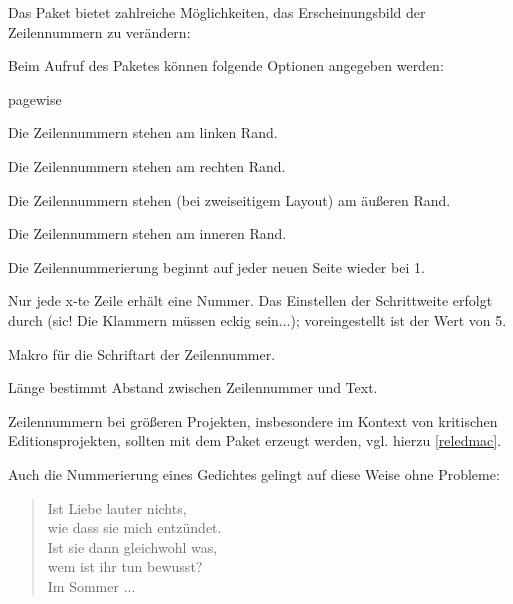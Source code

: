 
Das Paket bietet zahlreiche Möglichkeiten, das Erscheinungsbild der Zeilennummern zu 
verändern:

Beim Aufruf des Paketes können folgende Optionen angegeben werden:

\begin{labeling}{pagewise}
 \item[left] Die Zeilennummern stehen am linken Rand.
 \item[right] Die Zeilennummern stehen am rechten Rand.
 \item[switch] Die Zeilennummern stehen (bei zweiseitigem Layout) am äußeren Rand.
 \item[switch*] Die Zeilennummern stehen am inneren Rand.
 \item[pagewise] Die Zeilennummerierung beginnt auf jeder neuen Seite wieder bei 1.
 \item[modulo] Nur jede x-te Zeile erhält eine Nummer. 
  Das Einstellen der Schrittweite erfolgt durch  
  (sic! Die Klammern müssen eckig sein...);
  voreingestellt ist der Wert von 5.
\end{labeling}

Makro  für die Schriftart der Zeilennummer.

Länge  bestimmt Abstand zwischen Zeilennummer und Text.

Zeilennummern bei größeren Projekten, insbesondere im Kontext von kritischen Editionsprojekten,
sollten mit dem Paket  erzeugt werden, vgl. hierzu \ref{reledmac}.

 


Auch die Nummerierung eines Gedichtes gelingt auf diese Weise ohne Probleme:

\begin{lfgwexample}{}
 \begin{verse}
  \modulolinenumbers[5]
  \linenumbers
  Ist Liebe lauter nichts,\\
  wie dass sie mich entzündet.\\
  Ist sie dann gleichwohl was,\\
  wem ist ihr tun bewusst?\\
  
  Im Sommer ...\\
 \end{verse}

\end{lfgwexample}



